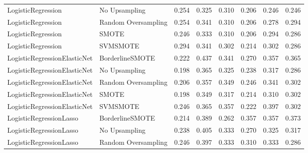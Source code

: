 \begin{tabular}{llllllll}
          LogisticRegression &       No Upsampling &     0.254 &                     0.325 &                 0.310 &                  0.206 &                                   0.246 &    0.246 \\
          LogisticRegression & Random Oversampling &     0.254 &                     0.341 &                 0.310 &                  0.206 &                                   0.278 &    0.294 \\
          LogisticRegression &               SMOTE &     0.246 &                     0.333 &                 0.310 &                  0.206 &                                   0.294 &    0.286 \\
          LogisticRegression &            SVMSMOTE &     0.294 &                     0.341 &                 0.302 &                  0.214 &                                   0.302 &    0.286 \\
LogisticRegressionElasticNet &     BorderlineSMOTE &     0.222 &                     0.437 &                 0.341 &                  0.270 &                                   0.357 &    0.365 \\
LogisticRegressionElasticNet &       No Upsampling &     0.198 &                     0.365 &                 0.325 &                  0.238 &                                   0.317 &    0.286 \\
LogisticRegressionElasticNet & Random Oversampling &     0.206 &                     0.357 &                 0.349 &                  0.246 &                                   0.341 &    0.302 \\
LogisticRegressionElasticNet &               SMOTE &     0.198 &                     0.349 &                 0.317 &                  0.214 &                                   0.310 &    0.302 \\
LogisticRegressionElasticNet &            SVMSMOTE &     0.246 &                     0.365 &                 0.357 &                  0.222 &                                   0.397 &    0.302 \\
     LogisticRegressionLasso &     BorderlineSMOTE &     0.214 &                     0.389 &                 0.262 &                  0.357 &                                   0.357 &    0.373 \\
     LogisticRegressionLasso &       No Upsampling &     0.238 &                     0.405 &                 0.333 &                  0.270 &                                   0.325 &    0.317 \\
     LogisticRegressionLasso & Random Oversampling &     0.246 &                     0.397 &                 0.333 &                  0.310 &                                   0.333 &    0.286 \\

\end{tabular}
